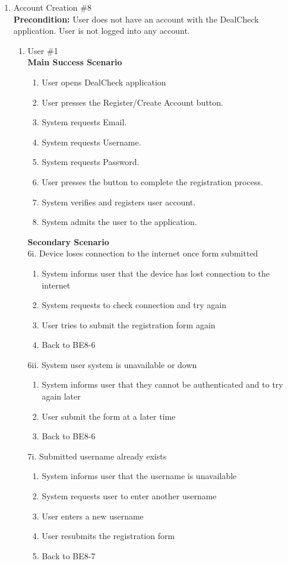 \documentclass[]{article}
\begin{document}
\begin{enumerate}
\begin{enumerate}[{\bf {BE}1.}]
\item Account Creation \#8 \\
{\bf Precondition:} User does not have an account with the DealCheck application. User is not logged into any account.
\begin{enumerate}[{\bf VP1.}]
    \item User \#1 \\
    {\bf Main Success Scenario}
    \begin{enumerate}[1.]
        \item User opens DealCheck application
        \item User presses the Register/Create Account button.
        \item System requests Email.
        \item System requests Username.
        \item System requests Password.
        \item User presses the button to complete the registration process.
        \item System verifies and registers user account.
        \item System admits the user to the application.
        
    \end{enumerate}
    {\bf Secondary Scenario} \\
    6i. Device loses connection to the internet once form submitted
    \begin{enumerate}[{6i}.1]
        \item System informs user that the device has lost connection to the internet
        \item System requests to check connection and try again
        \item User tries to submit the registration form again
        \item Back to BE8-6
    \end{enumerate}

    6ii. System user system is unavailable or down
    \begin{enumerate}[{6ii}.1]
        \item System informs user that they cannot be authenticated and to try again later
        \item User submit the form at a later time
        \item Back to BE8-6
    \end{enumerate}

    7i.  Submitted username already exists
    \begin{enumerate}[{7i}.1]
        \item System informs user that the username is unavailable
        \item System requests user to enter another username
        \item User enters a new username
        \item User resubmits the registration form
        \item Back to BE8-7
    \end{enumerate}


\end{enumerate}
\end{enumerate}
\end{enumerate}
\end{document}
